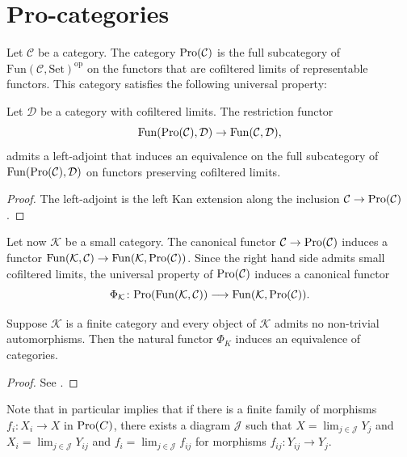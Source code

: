 \chapter{Pro-categories}

Let $\mathcal{C}$ be a category. The category $\mathrm{Pro}(\mathcal{C})$ is the full subcategory of
$\mathrm{Fun}(\mathcal{C}, \mathrm{Set})^{\mathrm{op}}$ on the functors that are cofiltered limits
of representable functors. This category satisfies the following universal property:

\begin{proposition}
    Let $\mathcal{D}$ be a category with cofiltered limits. The restriction functor
    \[
        \mathrm{Fun}(\mathrm{Pro}(\mathcal{C}), \mathcal{D}) \to \mathrm{Fun}(\mathcal{C}, \mathcal{D})
    ,\] admits a left-adjoint that induces an equivalence
    on the full subcategory of $\mathrm{Fun}(\mathrm{Pro}(\mathcal{C}), \mathcal{D})$ on functors preserving
    cofiltered limits.
    \label{prop:pro-univ-prop}
\end{proposition}

\begin{proof}
    The left-adjoint is the left Kan extension along the inclusion $\mathcal{C} \to \mathrm{Pro}(\mathcal{C})$.
\end{proof}

Let now $\mathcal{K}$ be a small category. The canonical functor $\mathcal{C} \to \mathrm{Pro}(\mathcal{C})$ induces
a functor $\mathrm{Fun}(\mathcal{K}, \mathcal{C}) \to \mathrm{Fun}(\mathcal{K}, \mathcal{\mathrm{Pro}(\mathcal{C})})$.
Since the right hand side admits small cofiltered limits, the universal property
of $\mathrm{Pro}(\mathcal{C})$ induces a canonical functor
\[
    \Phi_{\mathcal{K}}\colon \mathrm{Pro}(\mathrm{Fun}(\mathcal{K}, \mathcal{C})) \longrightarrow
    \mathrm{Fun}(\mathcal{K}, \mathcal{\mathrm{Pro}(\mathcal{C})})
.\]

\begin{proposition}
    Suppose $\mathcal{K}$ is a finite category and every object of $\mathcal{K}$ admits no
    non-trivial automorphisms. Then the natural functor $\Phi_K$ induces
    an equivalence of categories.
    \label{prop:finite-diag-pro}
\end{proposition}

\begin{proof}
    See \cite[Theorem 6.4.3]{kashiwara-shapira}.
\end{proof}

\begin{example}
    \label{ex:finite-diag-pro}
    Note that  in particular implies that if there is a
    finite family of morphisms $f_i \colon X_i \to X$ in $\mathrm{Pro}(C)$, there exists a diagram $\mathcal{J}$ such
    that $X = \lim_{j \in \mathcal{J}} Y_j$ and $X_i = \lim_{j \in \mathcal{J}} Y_{ij}$
    and $f_i = \lim_{j \in \mathcal{J}} f_{ij}$ for morphisms $f_{ij}\colon Y_{ij} \to Y_j$.
\end{example}

